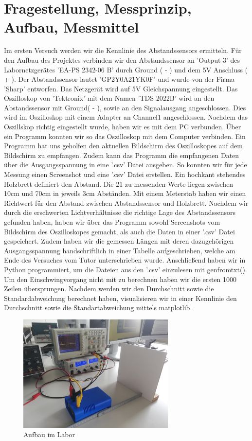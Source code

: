 \documentclass[12pt, oneside, a4paper, \docLanguage]{report}
\begin{document}
\section{Fragestellung, Messprinzip, Aufbau, Messmittel}
\label{chap:VERSUCH_1_FRAGESTELLUNG}
Im ersten Versuch werden wir die Kennlinie des Abstandssensors ermitteln.  Für den Aufbau des Projektes verbinden wir den Abstandssensor an 'Output 3' des Labornetzgerätes 'EA-PS 2342-06 B' durch Ground ( - ) und dem 5V Anschluss ( + ).
Der Abstandssensor lautet 'GP2Y0A21YK0F' und wurde von der Firma 'Sharp' entworfen. Das Netzgerät wird auf 5V Gleichspannung eingestellt. Das Oszilloskop von 'Tektronix' mit dem Namen 'TDS 2022B' wird an den Abstandssensor mit Ground( - ), sowie an den Signalausgang angeschlossen.
Dies wird im Oszilloskop mit einem Adapter an Channel1 angeschlossen. Nachdem das Oszillskop richtig eingestellt wurde, haben wir es mit dem PC verbunden.
Über ein Programm konnten wir so das Oszilloskop mit dem Computer verbinden. Ein Programm hat uns geholfen den aktuellen Bildschirm des Oszilloskopes auf dem Bildschirm zu empfangen.
Zudem kann das Programm die empfangenen Daten über die Ausgangsspannung in eine '.csv' Datei ausgeben.
So konnten wir für jede Messung einen Screenshot und eine '.csv' Datei erstellen. 
Ein hochkant stehendes Holzbrett definiert den Abstand. Die 21 zu messenden Werte liegen zwischen 10cm und 70cm in jeweils  3cm Abständen. Mit einem Meterstab haben wir einen Richtwert für den Abstand zwischen Abstandssensor und Holzbrett. 
Nachdem wir durch die erschwerten Lichtverhältnisse die richtige Lage des Abstandssensors gefunden haben, haben wir über das Programm sowohl Screenshots vom Bildschirm des Oszilloskopes gemacht, als auch die Daten in einer '.csv' Datei gespeichert.
Zudem haben wir die gemessen Längen mit deren dazugehörigen Ausgangsspannung handschriftlich in einer Tabelle aufgeschrieben, welche am Ende des Versuches vom Tutor unterschrieben wurde.
Anschließend haben wir in Python programmiert, um die Dateien aus den '.csv' einzulesen mit genfromtxt(). Um den Einschwingvorgang nicht mit zu berechnen haben wir die ersten 1000 Zeilen übersprungen. 
Nachdem werden wir den Durchschnitt sowie die Standardabweichung berechnet haben, visualisieren wir in einer Kennlinie den Durchschnitt sowie die Standartabweichung mittels matplotlib.
\begin{figure}[hbt!]
	\centering\small
	\includegraphics[width=0.7\textwidth]{media/aufbau.jpg}
	\caption{Aufbau im Labor}
	\label{fig:Aufbau im Labor}
\end{figure}
\newpage
\end{document}
